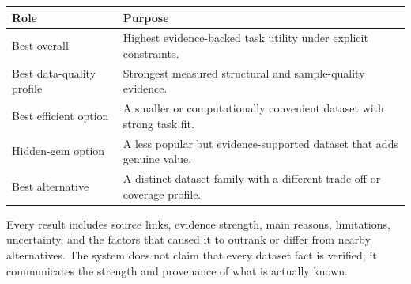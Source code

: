 \documentclass[11pt]{article}
\begin{document}
\begin{longtable}{@{}L{3.6cm}L{9.9cm}@{}}
\toprule
\textbf{Role} & \textbf{Purpose} \\
\midrule
\endhead
Best overall & Highest evidence-backed task utility under explicit constraints. \\
Best data-quality profile & Strongest measured structural and sample-quality evidence. \\
Best efficient option & A smaller or computationally convenient dataset with strong task fit. \\
Hidden-gem option & A less popular but evidence-supported dataset that adds genuine value. \\
Best alternative & A distinct dataset family with a different trade-off or coverage profile. \\
\bottomrule
\end{longtable}

Every result includes source links, evidence strength, main reasons, limitations, uncertainty, and the
factors that caused it to outrank or differ from nearby alternatives. The system does not claim that every
dataset fact is verified; it communicates the strength and provenance of what is actually known.

\end{document}
